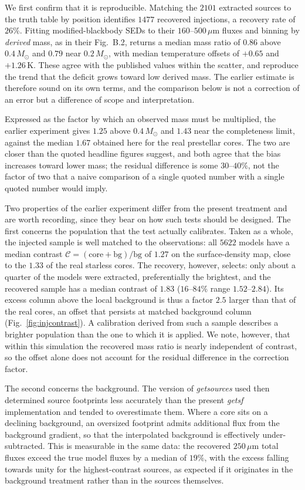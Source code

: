 \documentclass[11pt,a4paper]{article}
\newcommand{\msun}{M_{\odot}}
\begin{document}
We first confirm that it is reproducible. Matching the $2101$ extracted
sources to the truth table by position identifies $1477$ recovered
injections, a recovery rate of $26\%$. Fitting modified-blackbody SEDs to
their $160$--$500\,\mu$m fluxes and binning by \emph{derived} mass, as in
their Fig.~B.2, returns a median mass ratio of $0.86$ above $0.4\,\msun$ and
$0.79$ near $0.2\,\msun$, with median temperature offsets of $+0.65$ and
$+1.26$\,K. These agree with the published values within the scatter, and
reproduce the trend that the deficit grows toward low derived mass. The
earlier estimate is therefore sound on its own terms, and the comparison
below is not a correction of an error but a difference of scope and
interpretation.

Expressed as the factor by which an observed mass must be multiplied, the
earlier experiment gives $1.25$ above $0.4\,\msun$ and $1.43$ near the
completeness limit, against the median $1.67$ obtained here for the real
prestellar cores. The two are closer than the quoted headline figures
suggest, and both agree that the bias increases toward lower mass; the
residual difference is some $30$--$40\%$, not the factor of two that a naive
comparison of a single quoted number with a single quoted number would imply.

Two properties of the earlier experiment differ from the present treatment
and are worth recording, since they bear on how such tests should be
designed. The first concerns the population that the test actually
calibrates. Taken as a whole, the injected sample is well matched to the
observations: all $5622$ models have a median contrast
$\mathcal{C}=(\mathrm{core}+\mathrm{bg})/\mathrm{bg}$ of $1.27$ on the
surface-density map, close to the $1.33$ of the real starless cores. The
recovery, however, selects: only about a quarter of the models were
extracted, preferentially the brightest, and the recovered sample has a
median contrast of $1.83$ ($16$--$84\%$ range $1.52$--$2.84$). Its excess
column above the local background is thus a factor $2.5$ larger than that of
the real cores, an offset that persists at matched background column
(Fig.~\ref{fig:injcontrast}). A calibration derived from such a sample
describes a brighter population than the one to which it is applied. We note,
however, that within this simulation the recovered mass ratio is nearly
independent of contrast, so the offset alone does not account for the
residual difference in the correction factor.

The second concerns the background. The version of \emph{getsources} used
then determined source footprints less accurately than the present
\emph{getsf} implementation and tended to overestimate them. Where a core
sits on a declining background, an oversized footprint admits additional
flux from the background gradient, so that the interpolated background is
effectively under-subtracted. This is measurable in the same data: the
recovered $250\,\mu$m total fluxes exceed the true model fluxes by a median
of $19\%$, with the excess falling towards unity for the highest-contrast
sources, as expected if it originates in the background treatment rather
than in the sources themselves.
\end{document}

